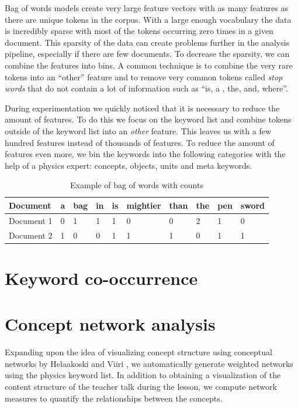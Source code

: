\documentclass[utf8,english]{gradu3}
\begin{document}
Bag of words models create very large feature vectors with as many features as there are unique tokens in the corpus. With a large enough vocabulary the data is incredibly sparse with most of the tokens occurring zero times in a given document. This sparsity of the data can create problems further in the analysis pipeline, especially if there are few documents. To decrease the sparsity, we can combine the features into bins. A common technique is to combine the very rare tokens into an \enquote{other} feature and to remove very common tokens called \emph{stop words} that do not contain a lot of information such as \enquote{is, a , the, and, where}.

During experimentation we quickly noticed that it is necessary to reduce the amount of features. To do this we focus on the keyword list and combine tokens outside of the keyword list into an \emph{other} feature. This leaves us with a few hundred features instead of thousands of features. To reduce the amount of features even more, we bin the keywords into the following categories with the help of a physics expert: concepts, objects, units and meta keywords.

\begin{table}[]
  \begin{tabular}{ | l | l | l | l | l | l | l | l | l | l |}
    \hline
    \textbf{Document} & \textbf{a} & \textbf{bag} & \textbf{in} & \textbf{is} & \textbf{mightier} & \textbf{than} & \textbf{the} & \textbf{pen} & \textbf{sword}\\ \hline
    Document 1 & 0 & 1 & 1 & 1 & 0 & 0 & 2 & 1 & 0\\ \hline
    Document 2 & 1 & 0 & 0 & 1 & 1 & 1 & 0 & 1 & 1\\
    \hline
  \end{tabular}
  \caption{Example of bag of words with counts}
  \label{table:counts}
\end{table}

\section{Keyword co-occurrence}

\section{Concept network analysis}

Expanding upon the idea of visualizing concept structure using conceptual networks by Helaakoski and Viiri \parencite*{helaakoskiContentContentStructure2014}, we automatically generate weighted networks using the physics keyword list. In addition to obtaining a visualization of the content structure of the teacher talk during the lesson, we compute network measures to quantify the relationships between the concepts.
\end{document}
